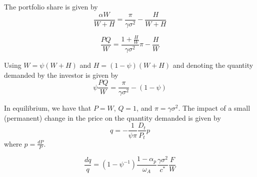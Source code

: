 \documentclass[11pt,english]{article}
\begin{document}
The portfolio share is given by
\begin{equation*}
    \frac{\alpha W}{W+H} = \frac{\pi}{\gamma\sigma^2} - \frac{H}{W+H} 
\end{equation*}

\begin{equation*}
    \frac{P Q}{W} = \frac{1+\frac{H}{W}}{\gamma \sigma^2} \pi - \frac{H}{W} 
\end{equation*}


Using $W = \psi (W+H)$ and $H = (1-\psi) (W+H)$ and denoting the quantity demanded by the investor is given by
\begin{equation*}
    \psi \frac{P Q}{W} = \frac{\pi}{\gamma\sigma^2} - (1-\psi)
\end{equation*}

In equilibrium, we have that $P = W$, $Q = 1$, and $\pi = \gamma \sigma^2$. The impact of a small (permanent) change in the price on the quantity demanded is given by
\begin{equation*}
    q = - \frac{1}{\psi \pi} \frac{D_t}{P_t} p
\end{equation*}
where $p = \frac{dP}{P}$. 

\begin{equation*}
    \frac{d q}{q} = (1-\psi^{-1}) \frac{1-\alpha_p}{\omega_A} \frac{\gamma \sigma^2}{c^*}  \frac{F}{W}
\end{equation*}

\newpage
\singlespacing
%
\clearpage

\end{document}
